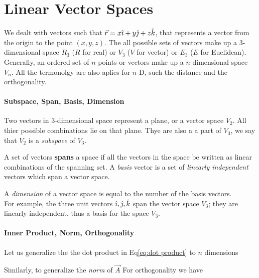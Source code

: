         \section{Linear Vector Spaces}
            We dealt with vectors such that $\vec{r} = x\hat{\imath} + y\hat{\jmath} + z\hat{k}$, that represents a vector from the origin to the point $(x, y, z)$. The all possible 
            sets of vectors make up a 3-dimensional space $R_3$ ($R$ for real) or $V_3$ ($V$ for vector) or $E_3$ ($E$ for Euclidean). Generally, an ordered set of $n$
            points or vectors make up a $n$-dimensional space $V_n$. All the termonolgy are also aplies for $n$-D, such the distance and the orthogonality.
            
            \paragraph{Subspace, Span, Basis, Dimension} %
            \label{par:Subspace, Span, Basis, Dimension}

            \bulletpar Two vectors in 3-dimensional space represent a plane, or a vector space $V_2$. All thier possible combinations lie on that plane. Thye are also a 
            a part of $V_3$, we say that $V_2$ is a \textit{subspace} of $V_3$.

            \bulletpar A set of vectors \textbf{spans} a space if all the vectors in the space be written as linear combinations of the spanning set. A \textit{basis} vector is 
            a set of \textit{linearly independent} vectors which span a vector space. 

            \bulletpar A \textit{dimension} of a vector space is equal to the number of the basis vectors. \\
            For example, the three unit vectors $\hat{\imath}, \hat{\jmath}, \hat{k}$ span the vector space $V_3$; they are linearly independent, thus a basis for the space $V_3$.

            \paragraph{Inner Product, Norm, Orthogonality} %
            \label{par:Inner Product, Norm, Orthogonality}
            Let us generalize the the dot product in Eq\eqref{eq:dot product} to $n$ dimensions

            Similarly, to generalize the \textit{norm} of $\vec{A}$
            For orthogonality we have 

